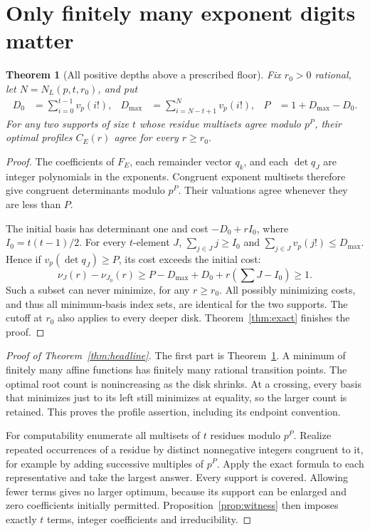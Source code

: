 \documentclass[11pt,letterpaper]{article}
\newtheorem{theorem}{Theorem}[section]
\theoremstyle{definition}\newtheorem{definition}[theorem]{Definition}
\theoremstyle{remark}\newtheorem{remark}[theorem]{Remark}
\newcommand{\vp}{v_p}
\begin{document}
\section{Only finitely many exponent digits matter}
\begin{theorem}[All positive depths above a prescribed floor]\label{thm:residues-all}
Fix $r_0>0$ rational, let $N=N_L(p,t,r_0)$, and put
\begin{align}
 D_0&=\sum_{i=0}^{t-1}\vp(i!),&
 D_{\max}&=\sum_{i=N-t+1}^{N}\vp(i!),&
 P&=1+D_{\max}-D_0.\label{eq:precision-all}
\end{align}
For any two supports of size $t$ whose residue multisets agree modulo
$p^P$, their optimal profiles $C_E(r)$ agree for every $r\ge r_0$.
\end{theorem}

\begin{proof}
The coefficients of $F_E$, each remainder vector $q_k$, and each
$\det q_J$ are integer polynomials in the exponents. Congruent
exponent multisets therefore give congruent determinants modulo $p^P$.
Their valuations agree whenever they are less than $P$.

The initial basis has determinant one and cost
$-D_0+rI_0$, where $I_0=t(t-1)/2$. For every $t$-element $J$,
$\sum_{j\in J}j\ge I_0$ and
$\sum_{j\in J}\vp(j!)\le D_{\max}$. Hence if
$\vp(\det q_J)\ge P$, its cost exceeds the initial cost:
\[
 \nu_J(r)-\nu_{J_0}(r)
 \ge P-D_{\max}+D_0+r(\textstyle\sum J-I_0)\ge1.
\]
Such a subset can never minimize, for any $r\ge r_0$. All possibly
minimizing costs, and thus all minimum-basis index sets, are identical
for the two supports. The cutoff at $r_0$ also applies to every deeper
disk. Theorem~\ref{thm:exact} finishes the proof.
\end{proof}

\begin{proof}[Proof of Theorem~\ref{thm:headline}]
The first part is Theorem~\ref{thm:residues-all}. A minimum of finitely
many affine functions has finitely many rational transition points.
The optimal root count is nonincreasing as the disk shrinks. At a
crossing, every basis that minimizes just to its left still minimizes
at equality, so the larger count is retained. This proves the profile
assertion, including its endpoint convention.

For computability enumerate all multisets of $t$ residues modulo
$p^P$. Realize repeated occurrences of a residue by distinct
nonnegative integers congruent to it, for example by adding successive
multiples of $p^P$. Apply the exact formula to each representative and
take the largest answer. Every support is covered. Allowing fewer
terms gives no larger optimum, because its support can be enlarged
and zero coefficients initially permitted. Proposition~\ref{prop:witness}
then imposes exactly $t$ terms, integer coefficients and irreducibility.
\end{proof}
\end{document}
